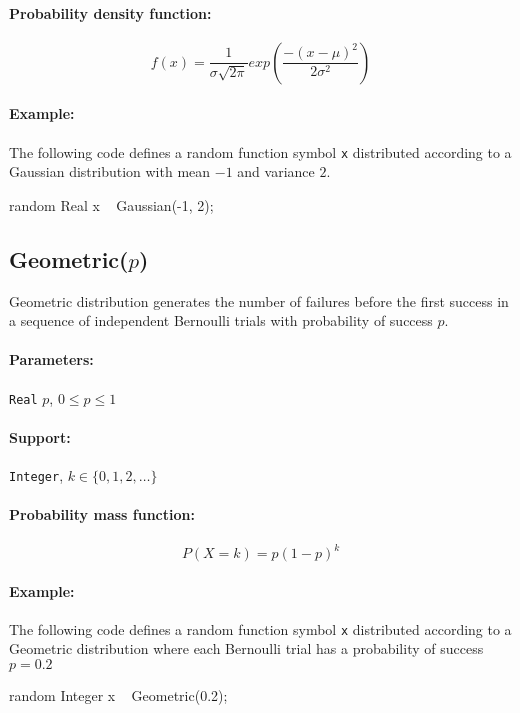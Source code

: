 \paragraph*{Probability density function:}
\[
	f(x) = \frac{1}{\sigma \sqrt{2 \pi}} exp(\frac{-(x-\mu)^{2}}{2 \sigma^{2}})
\]

\paragraph*{Example:}
The following code defines a random function symbol \verb|x| distributed according to a Gaussian distribution with mean $-1$ and variance $2$.
\begin{blogcode}
random Real x ~ Gaussian(-1, 2);
\end{blogcode}

\subsection{Geometric($p$)}
Geometric distribution generates the number of failures before the first success in a sequence of independent Bernoulli trials with probability of success $p$.

\paragraph*{Parameters:} 
\begin{itemize*}
\item[] \verb|Real|
 $p$, $0 \leq p \leq 1$ 
\end{itemize*}
\paragraph*{Support:} \verb|Integer|, $k \in \{0, 1, 2, \ldots \}$ 

\paragraph*{Probability mass function:}
\[
	P(X = k) = p(1-p)^{k}
\]

\paragraph*{Example:}
The following code defines a random function symbol \verb|x| distributed according to a Geometric distribution where each Bernoulli trial has a probability of success $p = 0.2$
\begin{blogcode}
random Integer x ~ Geometric(0.2);
\end{blogcode}

